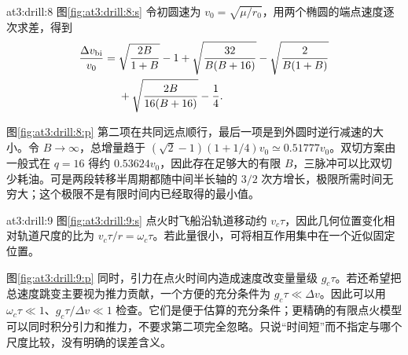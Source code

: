 \begin{drillsolution}{at3:drill:8}
  图\ref{fig:at3:drill:8:s} 令初圆速为 $v_0=\sqrt{\mu/r_0}$，用两个椭圆的端点速度逐次求差，得到
  \begin{align*}
  \frac{\Delta v_{\rm bi}}{v_0}={}&\sqrt{\frac{2B}{1+B}}-1
  +\sqrt{\frac{32}{B(B+16)}}-\sqrt{\frac{2}{B(1+B)}}\\
  &+\sqrt{\frac{2B}{16(B+16)}}-\frac14.
  \end{align*}

  图\ref{fig:at3:drill:8:p} 第二项在共同远点顺行，最后一项是到外圆时逆行减速的大小。令 $B\to\infty$，总增量趋于 $(\sqrt2-1)(1+1/4)v_0\simeq0.51777v_0$。双切方案由一般式在 $q=16$ 得约 $0.53624v_0$，因此存在足够大的有限 $B$，三脉冲可以比双切少耗油。可是两段转移半周期都随中间半长轴的 $3/2$ 次方增长，极限所需时间无穷大；这个极限不是有限时间内已经取得的最小值。\end{drillsolution}
\begin{drillsolution}{at3:drill:9}
  图\ref{fig:at3:drill:9:s} 点火时飞船沿轨道移动约 $v_c\tau$，因此几何位置变化相对轨道尺度的比为 $v_c\tau/r=\omega_c\tau$。若此量很小，可将相互作用集中在一个近似固定位置。

  图\ref{fig:at3:drill:9:p} 同时，引力在点火时间内造成速度改变量量级 $g_c\tau$。若还希望把总速度跳变主要视为推力贡献，一个方便的充分条件为 $g_c\tau\ll\Delta v$。因此可以用 $\omega_c\tau\ll1$、$g_c\tau/\Delta v\ll1$ 检查。它们是便于估算的充分条件；更精确的有限点火模型可以同时积分引力和推力，不要求第二项完全忽略。只说“时间短”而不指定与哪个尺度比较，没有明确的误差含义。\end{drillsolution}
